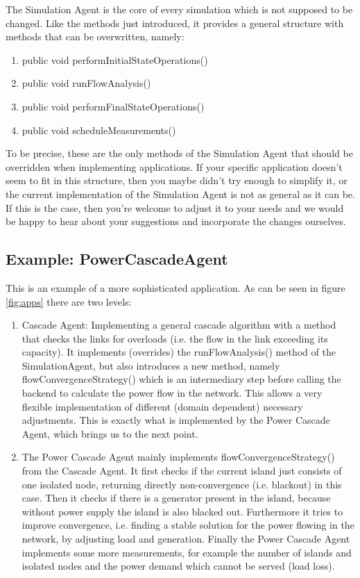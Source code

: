 \documentclass[11pt,fleqn]{book} %
\newcommand{\MainAgent}{Simulation Agent }
\newcommand{\CascadeAgent}{CascadeAgent}
\newcommand{\backend}[1][]{backend#1}
\newcommand{\domain}[1][]{domain#1}
\begin{document}
The \MainAgent{} is the core of every simulation which is not supposed to be changed. Like the methods just introduced, it provides a general structure with methods that can be overwritten, namely:
\begin{enumerate}
	\item public void performInitialStateOperations()
	\item public void runFlowAnalysis()
	\item public void performFinalStateOperations()
	\item public void scheduleMeasurements()
\end{enumerate}

To be precise, these are the only methods of the \MainAgent{} that should be overridden when implementing applications. If your specific application doesn’t seem to fit in this structure, then you maybe didn’t try enough to simplify it, or the current implementation of the \MainAgent{} is not as general as it can be. If this is the case, then you’re welcome to adjust it to your needs and we would be happy to hear about your suggestions and incorporate the changes ourselves.

\subsection{Example: Power\CascadeAgent{}}\index{Agent!Power\CascadeAgent{}}
This is an example of a more sophisticated application. As can be seen in figure \ref{fig:apps} there are two levels:
\begin{enumerate}
	\item Cascade Agent: Implementing a general cascade algorithm with a method that checks the links for overloads (i.e. the flow in the link exceeding its capacity). It implements (overrides) the runFlowAnalysis() method of the SimulationAgent, but also introduces a new method, namely flowConvergenceStrategy() which is an intermediary step before calling the \backend{} to calculate the power flow in the network. This allows a very flexible implementation of different (\domain{} dependent) necessary adjustments. This is exactly what is implemented by the Power Cascade Agent, which brings us to the next point.
	\item The Power Cascade Agent mainly implements flowConvergenceStrategy() from the Cascade Agent. It first checks if the current island just consists of one isolated node, returning directly non-convergence (i.e. blackout) in this case. Then it checks if there is a generator present in the island, because without power supply the island is also blacked out. Furthermore it tries to improve convergence, i.e. finding a stable solution for the power flowing in the network, by adjusting load and generation. Finally the Power Cascade Agent implements some more measurements, for example the number of islands and isolated nodes and the power demand which cannot be served (load loss).
\end{enumerate}
\end{document}
